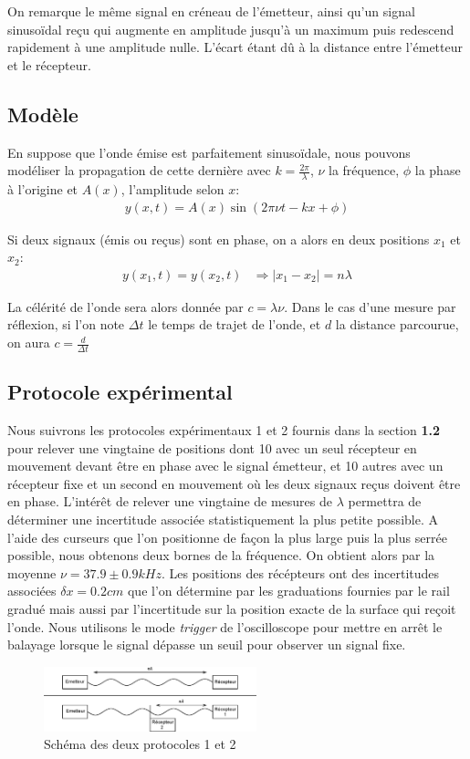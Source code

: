 \documentclass[12pt]{article}
\begin{document}
On remarque le même signal en créneau de l'émetteur, ainsi qu'un signal sinusoïdal reçu qui augmente en amplitude jusqu'à un maximum puis redescend rapidement à une amplitude nulle. L'écart étant dû à la distance entre l'émetteur et le récepteur.

\subsection{Modèle}
En suppose que l'onde émise est parfaitement sinusoïdale, nous pouvons modéliser la propagation de cette dernière avec $k=\frac{2\pi}{\lambda}$, $\nu$ la fréquence, $\phi$ la phase à l'origine et $A(x)$, l'amplitude selon $x$:
\begin{align}
	y(x, t) = A(x) \sin(2\pi\nu t - kx + \phi)
\end{align}

Si deux signaux (émis ou reçus) sont en phase, on a alors en deux positions $x_1$ et $x_2$:
\begin{align*}
	y(x_1, t) = y(x_2, t) & \Rightarrow |x_1 - x_2| = n\lambda
\end{align*}

La célérité de l'onde sera alors donnée par $c = \lambda \nu$. Dans le cas d'une mesure par réflexion, si l'on note $\Delta t$ le temps de trajet de l'onde, et $d$ la distance parcourue, on aura $c = \frac{d}{\Delta t}$

\subsection{Protocole expérimental}
Nous suivrons les protocoles expérimentaux 1 et 2 fournis dans la section \textbf{1.2} pour relever une vingtaine de positions dont 10 avec un seul récepteur en mouvement devant être en phase avec le signal émetteur, et 10 autres
avec un récepteur fixe et un second en mouvement où les deux signaux reçus doivent être en phase. L'intérêt de relever une vingtaine de mesures de $\lambda$ permettra de déterminer une incertitude associée statistiquement la plus petite possible. A l'aide des curseurs que l'on positionne de façon la plus large puis la plus serrée possible, nous obtenons deux bornes de la fréquence.
On obtient alors par la moyenne $\nu = 37.9 \pm 0.9 kHz$. Les positions des récépteurs ont des incertitudes associées $\delta x = 0.2cm$ que l'on détermine 
par les graduations fournies par le rail gradué mais aussi par l'incertitude sur la position exacte de la surface qui reçoit l'onde. 
Nous utilisons le mode \textit{trigger} de l'oscilloscope pour mettre en arrêt le balayage lorsque le signal dépasse un seuil pour observer un signal fixe.
\begin{figure}[!htbp]
	\centering
	\includegraphics[width=0.55\textwidth]{img/schema}
	\hfill
	\caption{Schéma des deux protocoles 1 et 2}
\end{figure}
\end{document}
